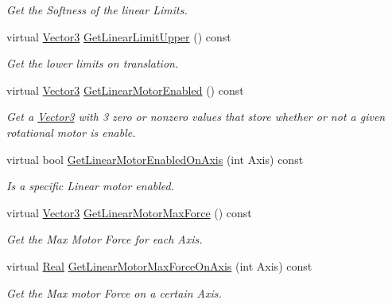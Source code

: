 \begin{DoxyCompactItemize}
\begin{DoxyCompactList}\small\item\em Get the Softness of the linear Limits. \item\end{DoxyCompactList}\item 
virtual \hyperlink{classMezzanine_1_1Vector3}{Vector3} \hyperlink{classMezzanine_1_1Generic6DofConstraint_aff95241b1756b5cc1ffaef4211272e6b}{GetLinearLimitUpper} () const 
\begin{DoxyCompactList}\small\item\em Get the lower limits on translation. \item\end{DoxyCompactList}\item 
virtual \hyperlink{classMezzanine_1_1Vector3}{Vector3} \hyperlink{classMezzanine_1_1Generic6DofConstraint_a89e87415dbe38493f724505cfcecad71}{GetLinearMotorEnabled} () const 
\begin{DoxyCompactList}\small\item\em Get a \hyperlink{classMezzanine_1_1Vector3}{Vector3} with 3 zero or nonzero values that store whether or not a given rotational motor is enable. \item\end{DoxyCompactList}\item 
virtual bool \hyperlink{classMezzanine_1_1Generic6DofConstraint_a7df83de658eec42ff0a35e4470baab82}{GetLinearMotorEnabledOnAxis} (int Axis) const 
\begin{DoxyCompactList}\small\item\em Is a specific Linear motor enabled. \item\end{DoxyCompactList}\item 
virtual \hyperlink{classMezzanine_1_1Vector3}{Vector3} \hyperlink{classMezzanine_1_1Generic6DofConstraint_a954466fb8e3ba12ec702eeab961d75f8}{GetLinearMotorMaxForce} () const 
\begin{DoxyCompactList}\small\item\em Get the Max Motor Force for each Axis. \item\end{DoxyCompactList}\item 
virtual \hyperlink{namespaceMezzanine_a726731b1a7df72bf3583e4a97282c6f6}{Real} \hyperlink{classMezzanine_1_1Generic6DofConstraint_a1d47c2671f8e8a918cffe568beca0af4}{GetLinearMotorMaxForceOnAxis} (int Axis) const 
\begin{DoxyCompactList}\small\item\em Get the Max motor Force on a certain Axis. \item\end{DoxyCompactList}\item 

\end{DoxyCompactItemize}
